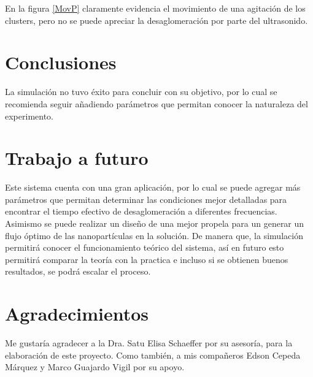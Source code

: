 \documentclass[12pt, letterpaper] {article}
\begin{document}
En la figura \ref{MovP} claramente evidencia el movimiento de una agitación de los clusters, pero no se puede apreciar la desaglomeración por parte del ultrasonido.

\section{Conclusiones}

La simulación no tuvo éxito para concluir con su objetivo, por lo cual se recomienda seguir añadiendo parámetros que permitan conocer la naturaleza del experimento.


\section{Trabajo a futuro}

Este sistema cuenta con una gran aplicación, por lo cual se puede agregar más parámetros que permitan determinar las condiciones mejor detalladas para encontrar el tiempo efectivo de desaglomeración a diferentes frecuencias. Asimismo se puede realizar un diseño de una mejor propela para un generar un flujo óptimo de las nanopartículas en la solución. De manera que, la simulación permitirá conocer el funcionamiento teórico del sistema, así en futuro esto permitirá comparar la teoría con la practica e incluso si se obtienen buenos resultados, se podrá escalar el proceso.

\section{Agradecimientos}

Me gustaría agradecer a la Dra. Satu Elisa Schaeffer por su asesoría, para la elaboración de este proyecto. Como también, a mis compañeros Edson Cepeda Márquez y Marco Guajardo Vigil por su apoyo. 




\end{document}
